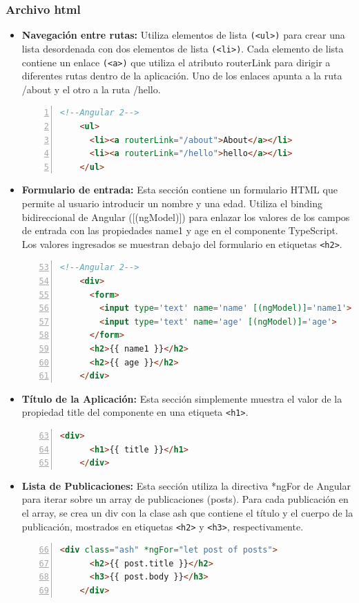 \documentclass{article}
\begin{document}
  \subsubsection{Archivo html}
  \begin{itemize}
    \item \textbf{Navegación entre rutas: }Utiliza elementos de lista \verb|(<ul>)| para crear una lista desordenada 
    con dos elementos de lista \verb|(<li>)|. Cada elemento de lista contiene un enlace \verb|(<a>)| que utiliza el atributo 
    routerLink para dirigir a diferentes rutas dentro de la aplicación. Uno de los enlaces apunta a la ruta /about 
    y el otro a la ruta /hello.
    \begin{lstlisting}[language=html, numbers=left, firstnumber=1, numberstyle=\color{orange}]
    <!--Angular 2-->
    <ul>
      <li><a routerLink="/about">About</a></li>
      <li><a routerLink="/hello">hello</a></li>
    </ul>
    \end{lstlisting}
    \item \textbf{Formulario de entrada: }Esta sección contiene un formulario HTML que permite al usuario introducir 
    un nombre y una edad. Utiliza el binding bidireccional de Angular ([(ngModel)]) para enlazar los valores de los 
    campos de entrada con las propiedades name1 y age en el componente TypeScript. Los valores ingresados se muestran 
    debajo del formulario en etiquetas \verb|<h2>|.
    \begin{lstlisting}[language=html, numbers=left, firstnumber=53, numberstyle=\color{orange}]
    <!--Angular 2-->
    <div>
      <form>
        <input type='text' name='name' [(ngModel)]='name1'>
        <input type='text' name='age' [(ngModel)]='age'>
      </form>
      <h2>{{ name1 }}</h2>
      <h2>{{ age }}</h2>
    </div>
    \end{lstlisting}
    \item \textbf{Título de la Aplicación: }Esta sección simplemente muestra el valor de la propiedad title del componente 
    en una etiqueta \verb|<h1>|.
    \begin{lstlisting}[language=html, numbers=left, firstnumber=63, numberstyle=\color{orange}]
    <div>
      <h1>{{ title }}</h1>
    </div>
    \end{lstlisting}
    \item \textbf{Lista de Publicaciones: }Esta sección utiliza la directiva *ngFor de Angular para iterar 
    sobre un array de publicaciones (posts). Para cada publicación en el array, se crea un div con la clase 
    ash que contiene el título y el cuerpo de la publicación, mostrados en etiquetas \verb|<h2>| y \verb|<h3>|, respectivamente.
    \begin{lstlisting}[language=html, numbers=left, firstnumber=66, numberstyle=\color{orange}]
    <div class="ash" *ngFor="let post of posts">
      <h2>{{ post.title }}</h2>
      <h3>{{ post.body }}</h3>
    </div>
    \end{lstlisting}
  \end{itemize}
  
\end{document}
